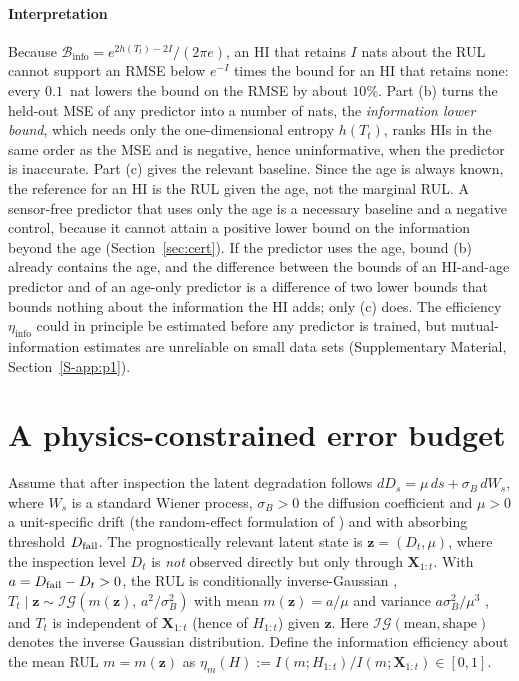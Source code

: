 \documentclass[preprint,12pt]{elsarticle}
\theoremstyle{definition}
\newcommand{\Binfo}{\mathcal{B}_{\mathrm{info}}}
\newcommand{\etaPIE}{\eta_{\mathrm{info}}}
\begin{document}
\paragraph{Interpretation} Because $\Binfo=e^{2h(T_t)-2I}/(2\pi e)$, an HI that retains $I$ nats about the RUL cannot support an RMSE below $e^{-I}$ times the bound for an HI that retains none: every $0.1$~nat lowers the bound on the RMSE by about $10\%$. Part (b) turns the held-out MSE of any predictor into a number of nats, the \emph{information lower bound}, which needs only the one-dimensional entropy $h(T_t)$, ranks HIs in the same order as the MSE and is negative, hence uninformative, when the predictor is inaccurate. Part (c) gives the relevant baseline. Since the age is always known, the reference for an HI is the RUL given the age, not the marginal RUL. A sensor-free predictor that uses only the age is a necessary baseline and a negative control, because it cannot attain a positive lower bound on the information beyond the age (Section~\ref{sec:cert}). If the predictor uses the age, bound (b) already contains the age, and the difference between the bounds of an HI-and-age predictor and of an age-only predictor is a difference of two lower bounds that bounds nothing about the information the HI adds; only (c) does. The efficiency $\etaPIE$ could in principle be estimated before any predictor is trained, but mutual-information estimates are unreliable on small data sets \cite{paninski2003} (Supplementary Material, Section~\ref{S-app:p1}).

\section{A physics-constrained error budget}
\label{sec:physbound}
Assume that after inspection the latent degradation follows $dD_s=\mu\,ds+\sigma_B\,dW_s$, where $W_s$ is a standard Wiener process, $\sigma_B>0$ the diffusion coefficient and $\mu>0$ a unit-specific drift (the random-effect formulation of \cite{gebraeel2005,wang2010}) and with absorbing threshold $D_{\rm fail}$. The prognostically relevant latent state is $\mathbf z=(D_t,\mu)$, where the inspection level $D_t$ is \emph{not} observed directly but only through $\mathbf{X}_{1:t}$. With $a=D_{\rm fail}-D_t>0$, the RUL is conditionally inverse-Gaussian \cite{folks1978,tweedie1957}, $T_t\mid\mathbf z\sim\mathcal{IG}(m(\mathbf z),\,a^2/\sigma_B^2)$ with mean $m(\mathbf z)=a/\mu$ and variance $a\sigma_B^2/\mu^3$ \cite{chhikara1989}, and $T_t$ is independent of $\mathbf{X}_{1:t}$ (hence of $H_{1:t}$) given $\mathbf z$. Here $\mathcal{IG}(\text{mean},\text{shape})$ denotes the inverse Gaussian distribution. Define the information efficiency about the mean RUL $m=m(\mathbf z)$ as $\eta_m(H):=I(m;H_{1:t})/I(m;\mathbf{X}_{1:t})\in[0,1]$.
\end{document}
